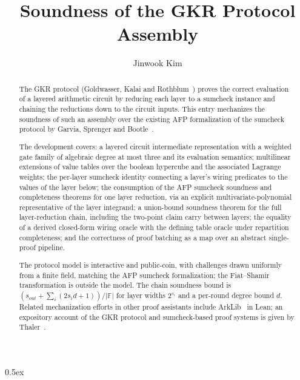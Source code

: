 \documentclass[11pt,a4paper]{article}
\begin{document}
\title{Soundness of the GKR Protocol Assembly}
\author{Jinwook Kim}

\maketitle

\begin{abstract}
The GKR protocol (Goldwasser, Kalai and Rothblum~\cite{gkr2015}) proves
the correct evaluation of a layered arithmetic circuit by reducing each
layer to a sumcheck instance and chaining the reductions down to the
circuit inputs.  This entry mechanizes the soundness of such an
assembly over the existing AFP formalization of the sumcheck protocol
by Garvia, Sprenger and Bootle~\cite{Sumcheck_Protocol-AFP}.

The development covers: a layered circuit intermediate representation
with a weighted gate family of algebraic degree at most three and its
evaluation semantics; multilinear extensions of value tables over the
boolean hypercube and the associated Lagrange weights; the per-layer
sumcheck identity connecting a layer's wiring predicates to the values
of the layer below; the consumption of the AFP sumcheck soundness and
completeness theorems for one layer reduction, via an explicit
multivariate-polynomial representative of the layer integrand; a
union-bound soundness theorem for the full layer-reduction chain,
including the two-point claim carry between layers; the equality of a
derived closed-form wiring oracle with the defining table oracle under
repartition completeness; and the correctness of proof batching as a
map over an abstract single-proof pipeline.

The protocol model is interactive and public-coin, with challenges
drawn uniformly from a finite field, matching the AFP sumcheck
formalization; the Fiat--Shamir transformation is outside the model.
The chain soundness bound is
$(s_{\mathit{out}} + \sum_i (2 s_i d + 1))/|\mathbb{F}|$ for layer
widths $2^{s_i}$ and a per-round degree bound $d$.  Related
mechanization efforts in other proof assistants include
ArkLib~\cite{arklib} in Lean; an expository account of the GKR
protocol and sumcheck-based proof systems is given by
Thaler~\cite{thaler2022}.
\end{abstract}

\tableofcontents

\newpage

\parindent 0pt\parskip 0.5ex





\end{document}
